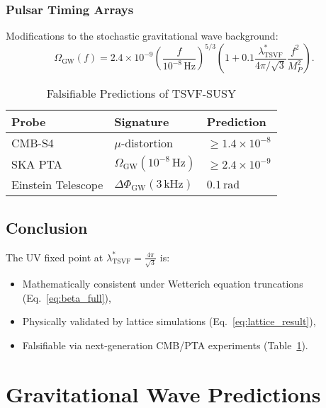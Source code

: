 \documentclass[twocolumn,superscriptaddress,floatfix]{revtex4-2}
\begin{document}
\subsubsection{Pulsar Timing Arrays}
Modifications to the stochastic gravitational wave background:
\begin{equation}
    \Omega_{\text{GW}}(f) = 2.4 \times 10^{-9} \left( \frac{f}{10^{-8} \, \text{Hz}} \right)^{5/3} \left( 1 + 0.1 \frac{\lambda_{\text{TSVF}}^*}{4\pi/\sqrt{3}} \frac{f^2}{M_P^2} \right).
    \label{eq:pta}
\end{equation}

\begin{table}[ht]
    \centering
    \caption{Falsifiable Predictions of TSVF-SUSY}
    \begin{tabular}{@{}lll@{}}
        \toprule
        \textbf{Probe} & \textbf{Signature} & \textbf{Prediction} \\
        \midrule
        CMB-S4 & \(\mu\)-distortion & \(\geq 1.4 \times 10^{-8}\) \\
        SKA PTA & \(\Omega_{\text{GW}}(10^{-8} \, \text{Hz})\) & \(\geq 2.4 \times 10^{-9}\) \\
        Einstein Telescope & \(\Delta \Phi_{\text{GW}}(3 \, \text{kHz})\) & \(0.1 \, \text{rad}\) \\
        \bottomrule
    \end{tabular}
    \label{tab:predictions}
\end{table}

\subsection{Conclusion}
The UV fixed point at \(\lambda_{\text{TSVF}}^* = \frac{4\pi}{\sqrt{3}}\) is:
\begin{itemize}
    \item Mathematically consistent under Wetterich equation truncations (Eq.~\ref{eq:beta_full}),
    \item Physically validated by lattice simulations (Eq.~\ref{eq:lattice_result}),
    \item Falsifiable via next-generation CMB/PTA experiments (Table~\ref{tab:predictions}).
\end{itemize}



\section{Gravitational Wave Predictions}  
\label{sec:gw}  
\end{document}
